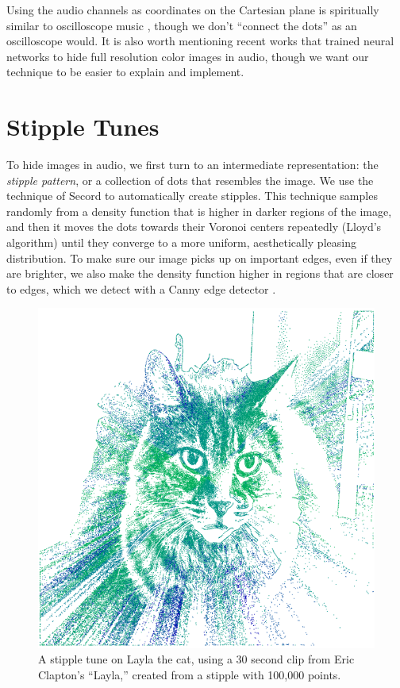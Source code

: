 \documentclass[runningheads]{llncs}
\begin{document}
Using the audio channels as coordinates on the Cartesian plane is spiritually similar to oscilloscope music \cite{felix2021_RenderingShapes}\cite{Charles2013}\cite{teschler2021}, though we don't ``connect the dots'' as an oscilloscope would.  It is also worth mentioning recent works that trained neural networks to hide full resolution color images \cite{cui_multi-stage_2021}\cite{geleta_pixinwav_2021}\cite{takahashi_source_2022}\cite{domenech2022hiding} in audio, though we want our technique to be easier to explain and implement.

\section{Stipple Tunes}

To hide images in audio, we first turn to an intermediate representation: the {\em stipple pattern}, or a collection of dots that resembles the image.  We use the technique of Secord \cite{secord2002weighted} to automatically create stipples.  This technique samples randomly from a density function that is higher in darker regions of the image, and then it moves the dots towards their Voronoi centers repeatedly (Lloyd's algorithm) until they converge to a more uniform, aesthetically pleasing distribution.  To make sure our image picks up on important edges, even if they are brighter, we also make the density function higher in regions that are closer to edges, which we detect with a Canny edge detector \cite{canny1986computational}.

\begin{figure}
  \centering
  \includegraphics[width=0.8\columnwidth]{laylaViterbiStipple.png}
  \caption{A stipple tune on Layla the cat, using a 30 second clip from Eric Clapton's ``Layla,'' created from a stipple with 100,000 points.}
  \label{fig:laylaViterbiStipple}
\end{figure}
\end{document}
